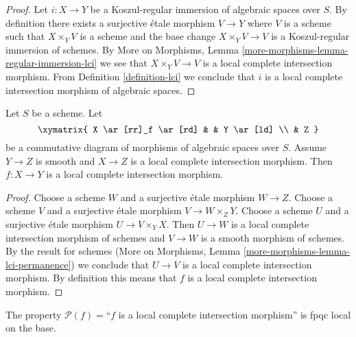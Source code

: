 \begin{proof}
Let $i : X \to Y$ be a Koszul-regular immersion of algebraic spaces
over $S$. By definition there exists a surjective \'etale morphism
$V \to Y$ where $V$ is a scheme such that $X \times_Y V$ is a scheme
and the base change $X \times_Y V \to V$ is a Koszul-regular immersion of
schemes. By More on Morphisms, Lemma
\ref{more-morphisms-lemma-regular-immersion-lci} we see that
$X \times_Y V \to V$ is a local complete intersection morphism.
From Definition \ref{definition-lci} we conclude that $i$ is a
local complete intersection morphism of algebraic spaces.
\end{proof}

\begin{lemma}
\label{lemma-lci-permanence}
Let $S$ be a scheme. Let
$$
\xymatrix{
X \ar[rr]_f \ar[rd] & & Y \ar[ld] \\
& Z
}
$$
be a commutative diagram of morphisms of algebraic spaces over $S$.
Assume $Y \to Z$ is smooth and $X \to Z$ is a
local complete intersection morphism.
Then $f : X \to Y$ is a local complete intersection morphism.
\end{lemma}

\begin{proof}
Choose a scheme $W$ and a surjective \'etale morphism $W \to Z$.
Choose a scheme $V$ and a surjective \'etale morphism $V \to W \times_Z Y$.
Choose a scheme $U$ and a surjective \'etale morphism $U \to V \times_Y X$.
Then $U \to W$ is a local complete intersection morphism of schemes and
$V \to W$ is a smooth morphism of schemes. By the result for schemes
(More on Morphisms, Lemma \ref{more-morphisms-lemma-lci-permanence})
we conclude that $U \to V$ is a local complete intersection morphism.
By definition this means that $f$ is a local complete intersection morphism.
\end{proof}

\begin{lemma}
\label{lemma-descending-property-lci}
The property $\mathcal{P}(f) =$``$f$ is a local complete intersection
morphism'' is fpqc local on the base.
\end{lemma}


